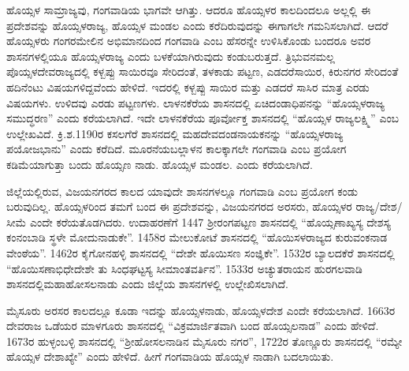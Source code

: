 ಹೊಯ್ಸಳ ಸಾಮ್ರಾಜ್ಯವು, ಗಂಗವಾಡಿಯ ಭಾಗವೇ ಆಗಿತ್ತು. ಆದರೂ ಹೊಯ್ಸಳರ ಕಾಲದಿಂದಲೂ ಅಲ್ಲಲ್ಲಿ ಈ ಪ್ರದೇಶವನ್ನು ಹೊಯ್ಸಳರಾಜ್ಯ, ಹೊಯ್ಸಳ ಮಂಡಲ ಎಂದು ಕರೆದಿರುವುದನ್ನು ಈಗಾಗಲೇ ಗಮನಿಸಲಾಗಿದೆ. ಆದರೆ ಹೊಯ್ಸಳರು ಗಂಗರಮೇಲಿನ ಅಭಿಮಾನದಿಂದ ಗಂಗವಾಡಿ ಎಂಬ ಹೆಸರನ್ನೇ ಉಳಿಸಿಕೊಂಡು ಬಂದರೂ ಅವರ ಶಾಸನಗಳಲ್ಲಿಯೂ ಹೊಯ್ಸಳರಾಜ್ಯ ಎಂದು ಬಳಕೆಯಾಗಿರುವುದು ಕಂಡುಬರುತ್ತದೆ. ತ್ರಿಭುವನಮಲ್ಲ ಪೊಯ್ಸಳದೇವರಾಜ್ಯದಲ್ಲಿ ಕಳ್ಬಪ್ಪು ಸಾಯಿರವೂ ಸೇರಿದಂತೆ, ತಳಕಾಡು ಪಟ್ಟಣ, ಎಡದರೆಸಾಯಿರ, ಕಿರುನಗರ ಸೇರಿದಂತೆ ಹದಿನೆಂಟು ವಿಷಯಗಳಿದ್ದವೆಂದು ಹೇಳಿದೆ. ಇದರಲ್ಲಿ ಕಳ್ಬಪ್ಪು ಸಾಯಿರ ಮತ್ತು ಎಡದರೆ ಸಾಸಿರ ಮಾತ್ರ ಎರಡು ವಿಷಯಗಳು. ಉಳಿದವು ಎರಡು ಪಟ್ಟಣಗಳು. ಲಾಳನಕೆರೆಯ ಶಾಸನದಲ್ಲಿ ಏಚಿದಂಡಾಧಿಪನನ್ನು “ಹೊಯ್ಸಳರಾಜ್ಯ ಸಮುದ್ಧರಣ” ಎಂದು ಕರೆಯಲಾಗಿದೆ. ಇದೇ ಲಾಳನಕೆರೆಯ ಪೂರ್ವೋಕ್ತ ಶಾಸನದಲ್ಲಿ “ಹೊಯ್ಸಳ ರಾಜ್ಯಲಕ್ಷ್ಮಿ” ಎಂಬ ಉಲ್ಲೇಖವಿದೆ. ಕ್ರಿ.ಶ.1190ರ ಕಸಲಗೆರೆ ಶಾಸನದಲ್ಲಿ ಮಹದೇವದಂಡನಾಯಕನನ್ನು “ಹೊಯ್ಸಳರಾಜ್ಯ ಪಯೋಜಭಾನು” ಎಂದು ಕರೆದಿದೆ. ಮೂರನೆಯ\break ಬಲ್ಲಾಳನ ಕಾಲಕ್ಕಾಗಲೇ ಗಂಗವಾಡಿ ಎಂಬ ಪ್ರಯೋಗ ಕಡಿಮೆಯಾಗುತ್ತಾ ಬಂದು ಹೊಯ್ಸಣ ನಾಡು. ಹೊಯ್ಸಳ ಮಂಡಲ. ಎಂದು ಕರೆಯಲಾಗಿದೆ.

ಜಿಲ್ಲೆಯಲ್ಲಿರುವ, ವಿಜಯನಗರದ ಕಾಲದ ಯಾವುದೇ ಶಾಸನಗಳಲ್ಲೂ ಗಂಗವಾಡಿ ಎಂಬ ಪ್ರಯೋಗ ಕಂಡು ಬರುವುದಿಲ್ಲ. ಹೊಯ್ಸಳರಿಂದ ತಮಗೆ ಬಂದ ಈ ಪ್ರದೇಶವನ್ನು, ವಿಜಯನಗರದ ಅರಸರು, ಹೊಯ್ಸಳರ ರಾಜ್ಯ/ದೇಶ/ಸೀಮೆ ಎಂದೇ ಕರೆಯತೊಡಗಿದರು. ಉದಾಹರಣೆಗೆ 1447 ಶ‍್ರೀರಂಗಪಟ್ಟಣ ಶಾಸನದಲ್ಲಿ “ಹೊಯ್ಸಣಾಖ್ಯಸ್ಯ ದೇಶಸ್ಯ ಕಂನಂಬಾಡಿ ಸ್ಥಳೇ ಮೋದುನಾಡುಕೇ”. 1458ರ ಮೇಲುಕೋಟೆ ಶಾಸನದಲ್ಲಿ “ಹೊಯಿಸಳರಾಜ್ಯದ ಕುರುವಂಕನಾಡ ವೇಂಠೆಯ”. 1462ರ ಕೈಗೋನಹಳ್ಳಿ ಶಾಸನದಲ್ಲಿ “ದೇಶೇ ಹೊಯಿಸಣ ಸಂಜ್ಞಿಕೇ”. 1532ರ ಬ್ಯಾಲದಕೆರೆ ಶಾಸನದಲ್ಲಿ “ಹೊಯಿಸಣಾಭಿಧೇ\break ದೇಶೇ ತು ಸಿಂಧಘಟ್ಟಸ್ಯ ಸೀಮಾಂತವರ್ತಿನ”. 1533ರ ಅಚ್ಯುತರಾಯನ ಹುರಗಲವಾಡಿ ಶಾಸನದಲ್ಲಿ\break ಮಹಾಹೋಸಲನಾಡು ಎಂದು ಜಿಲ್ಲೆಯ ಶಾಸನಗಳಲ್ಲಿ ಉಲ್ಲೇಖಿಸಲಾಗಿದೆ.

ಮೈಸೂರು ಅರಸರ ಕಾಲದಲ್ಲೂ ಕೂಡಾ ಇದನ್ನು ಹೊಯ್ಸಳನಾಡು, ಹೊಯ್ಸಳದೇಶ ಎಂದೇ ಕರೆಯಲಾಗಿದೆ. 1663ರ ದೇವರಾಜ ಒಡೆಯರ ಮಾಳಗೂರು ಶಾಸನದಲ್ಲಿ “ವಿಕ್ರಮಾರ್ಜಿತವಾಗಿ ಬಂದ ಹೊಯ್ಸಲನಾಡ” ಎಂದು ಹೇಳಿದೆ. 1673ರ ಹುಳ್ಳಂಬಳ್ಳಿ ಶಾಸನದಲ್ಲಿ “ಶ‍್ರೀಹೋಸಲನಾಡಿನ ಮೈಸೂರು ನಗರ”, 1722ರ ತೊಣ್ಣೂರು ಶಾಸನದಲ್ಲಿ “ರಮ್ಯೇ ಹೊಯ್ಸಳ ದೇಶಾಖ್ಯೇ” ಎಂದು ಹೇಳಿದೆ. ಹೀಗೆ ಗಂಗವಾಡಿಯ ಹೊಯ್ಸಳ ನಾಡಾಗಿ ಬದಲಾಯಿತು.


